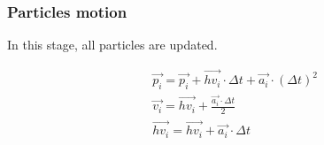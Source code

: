 \subsubsection{Particles motion}

In this stage, all particles are updated.

\[
\begin{split}
&\vec{p_i} = \vec{p_i} + \overrightarrow{hv_i} \cdot \Delta t + \vec{a_i} \cdot (\Delta t)^2\\
&\vec{v_i} = \overrightarrow{hv_i} + \frac{\vec{a_i} \cdot \Delta t}{2}\\
&\overrightarrow{hv_i} = \overrightarrow{hv_i} + \vec{a_i} \cdot \Delta t
\end{split}
\]
